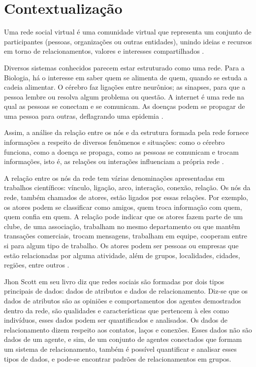 









\frenchspacing 
\imprimircapa

\textual

\section*{Contextualização}

Uma rede social virtual é uma comunidade virtual que representa um conjunto de participantes (pessoas, organizações ou outras entidades), unindo ideias e recursos em torno de relacionamentos, valores e interesses compartilhados \cite{Marteleto:2001}.

Diversos sistemas conhecidos parecem estar estruturado como uma rede. Para a Biologia, há o interesse em saber quem se alimenta de quem, quando se estuda a cadeia alimentar. O cérebro faz ligações entre neurônios; as sinapses, para que a pessoa lembre ou resolva algum problema ou questão. A internet é uma rede na qual as pessoas se conectam e se comunicam. As doenças podem se propagar de uma pessoa para outras, deflagrando uma epidemia \cite{Goular:2014}.

Assim, a análise da relação entre os nós e da estrutura formada pela rede fornece informações a respeito de diversos fenômenos e situações: como o cérebro funciona, como a doença se propaga, como as pessoas se comunicam e trocam informações, isto é, as relações ou interações influenciam a própria rede \cite{Goular:2014}.

A relação entre os nós da rede tem várias denominações apresentadas em trabalhos científicos: vínculo, ligação, arco, interação, conexão, relação. Os nós da rede, também chamados de atores, estão ligados por essas relações. Por exemplo, os atores podem se classificar como amigos, quem troca informação com quem, quem confia em quem. A relação pode indicar que os atores fazem parte de um clube, de uma associação, trabalham no mesmo departamento ou que mantêm transações comerciais, trocam mensagens, trabalham em equipe, cooperam entre si para algum tipo de trabalho. Os atores podem ser pessoas ou empresas que estão relacionadas por alguma atividade, além de grupos, localidades, cidades, regiões, entre outros \cite{Hanneman:Riddle:2005}.

Jhon Scott em seu livro \cite{Scott:Carrington:2011} diz que redes sociais são formadas por dois tipos principais de dados: dados de atributos e dados de relacionamento. Diz-se que os dados de atributos são as opiniões e comportamentos dos agentes demostrados dentro da rede, são qualidades e características que pertencem à eles como indivíduos, esses dados podem ser quantificados e analisados. Os dados de relacionamento dizem respeito aos contatos, laços e conexões. Esses dados não são dados de um agente, e sim, de um conjunto de agentes conectados que formam um sistema de relacionamento, também é possível quantificar e analisar esses tipos de dados, e pode-se encontrar padrões de relacionamentos em grupos.

